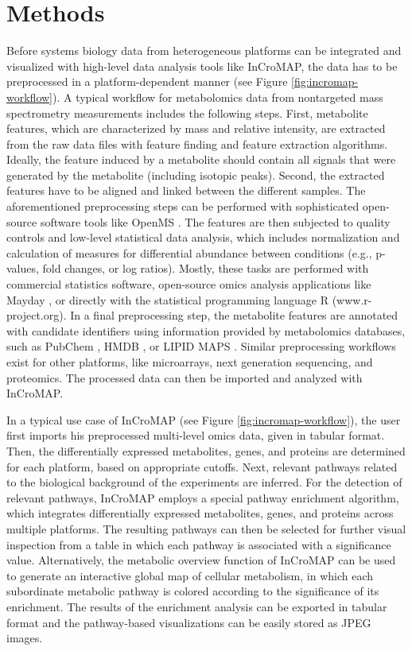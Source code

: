\documentclass[final,5p,times,twocolumn]{elsarticle}
\begin{document}
\section{Methods}
Before systems biology data from heterogeneous platforms can be integrated and visualized with high-level data analysis tools like InCroMAP, the data has to be preprocessed in a platform-dependent manner (see Figure \ref{fig:incromap-workflow}). A typical workflow for metabolomics data from nontargeted mass spectrometry measurements includes the following steps. First, metabolite features, which are characterized by mass and relative intensity, are extracted from the raw data files with feature finding and feature extraction algorithms. Ideally, the feature induced by a metabolite should contain all signals that were generated by the metabolite (including isotopic peaks). Second, the extracted features have to be aligned and linked between the different samples. The aforementioned preprocessing steps can be performed with sophisticated open-source software tools like OpenMS \cite{Sturm2008}. The  features are then subjected to quality controls and low-level statistical data analysis, which includes normalization and calculation of measures for differential abundance between conditions (e.g., p-values, fold changes, or log ratios). Mostly, these tasks are performed with commercial statistics software, open-source omics analysis applications like Mayday \cite{Battke2010}, or directly with the statistical programming language R (www.r-project.org). In a final preprocessing step, the metabolite features are annotated with candidate identifiers using information provided by metabolomics databases, such as PubChem \cite{Wang2009}, HMDB \cite{Wishart2009}, or LIPID MAPS \cite{Sud2007}. Similar preprocessing workflows exist for other platforms, like microarrays, next generation sequencing, and proteomics. The processed data can then be imported and analyzed with InCroMAP.

In a typical use case of InCroMAP (see Figure \ref{fig:incromap-workflow}), the user first imports his preprocessed multi-level omics data, given in tabular format. Then, the differentially expressed metabolites, genes, and proteins are determined for each platform, based on appropriate cutoffs. Next, relevant pathways related to the biological background of the experiments are inferred. For the detection of relevant pathways, InCroMAP employs a special pathway enrichment algorithm, which integrates differentially expressed metabolites, genes, and proteins across multiple platforms. The resulting pathways can then be selected for further visual inspection from a table in which each pathway is associated with a significance value. Alternatively, the metabolic overview function of InCroMAP can be used to generate an interactive global map of cellular metabolism, in which each subordinate metabolic pathway is colored according to the significance of its enrichment. The results of the enrichment analysis can be exported in tabular format and the pathway-based visualizations can be easily stored as JPEG images.
\end{document}
